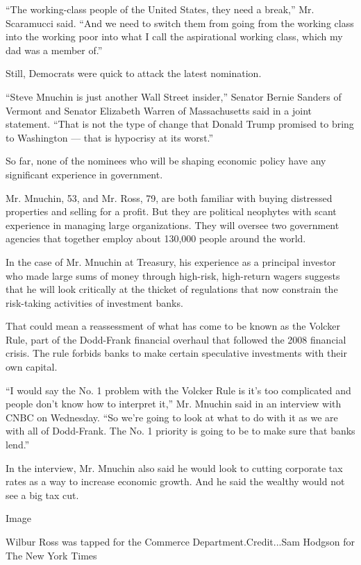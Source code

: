 ``The working-class people of the United States, they need a break,''
Mr. Scaramucci said. ``And we need to switch them from going from the
working class into the working poor into what I call the aspirational
working class, which my dad was a member of.''

Still, Democrats were quick to attack the latest nomination.

``Steve Mnuchin is just another Wall Street insider,'' Senator Bernie
Sanders of Vermont and Senator Elizabeth Warren of Massachusetts said in
a joint statement. ``That is not the type of change that Donald Trump
promised to bring to Washington --- that is hypocrisy at its worst.''

So far, none of the nominees who will be shaping economic policy have
any significant experience in government.

Mr. Mnuchin, 53, and Mr. Ross, 79, are both familiar with buying
distressed properties and selling for a profit. But they are political
neophytes with scant experience in managing large organizations. They
will oversee two government agencies that together employ about 130,000
people around the world.

In the case of Mr. Mnuchin at Treasury, his experience as a principal
investor who made large sums of money through high-risk, high-return
wagers suggests that he will look critically at the thicket of
regulations that now constrain the risk-taking activities of investment
banks.

That could mean a reassessment of what has come to be known as the
Volcker Rule, part of the Dodd-Frank financial overhaul that followed
the 2008 financial crisis. The rule forbids banks to make certain
speculative investments with their own capital.

``I would say the No. 1 problem with the Volcker Rule is it's too
complicated and people don't know how to interpret it,'' Mr. Mnuchin
said in an interview with CNBC on Wednesday. ``So we're going to look at
what to do with it as we are with all of Dodd-Frank. The No. 1 priority
is going to be to make sure that banks lend.''

In the interview, Mr. Mnuchin also said he would look to cutting
corporate tax rates as a way to increase economic growth. And he said
the wealthy would not see a big tax cut.

Image

Wilbur Ross was tapped for the Commerce Department.Credit...Sam Hodgson
for The New York Times

